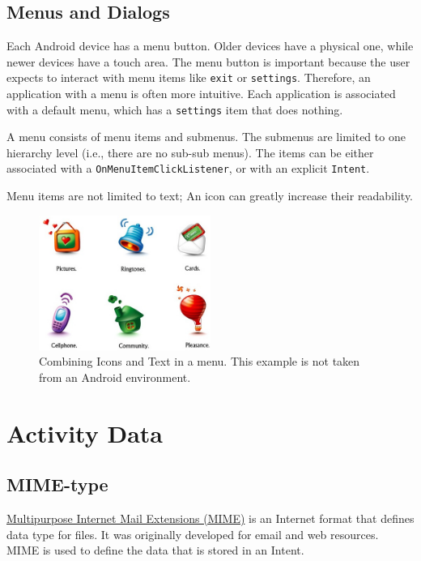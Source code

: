 \documentclass{article}
\begin{document}
\subsection{Menus and Dialogs}

Each Android device has a menu button. Older devices have a physical one, while newer devices have a touch area. The menu button is important because the user expects to interact with menu items like \texttt{exit} or  \texttt{settings}. Therefore, an application with a menu is often more intuitive. Each application is associated with a default menu, which has a \texttt{settings} item that does nothing.

A menu consists of menu items and submenus. The submenus are limited to one hierarchy level (i.e., there are no sub-sub menus). The items can be either associated with a \texttt{OnMenuItemClickListener}, or with an explicit \texttt{Intent}.

Menu items are not limited to text;  An icon can greatly increase their readability.

\begin{figure}[h!]
  \centering
      \includegraphics[width=0.5\textwidth]{img/icons.jpeg}
  \caption{Combining Icons and Text in a menu. This example is not taken from an Android environment.}
\end{figure}

\section{Activity Data}
\subsection{MIME-type}
\href{http://en.wikipedia.org/wiki/MIME}{Multipurpose Internet Mail Extensions (MIME)} is an Internet format that defines data type for files. It was originally developed for email and web resources. MIME is used to define the data that is stored in an Intent.
\end{document}
